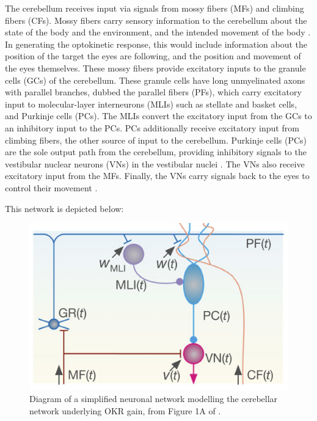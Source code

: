 \documentclass[10pt]{article}
\begin{document}
The cerebellum receives input via signals from mossy fibers (MFs) and climbing fibers (CFs). Mossy fibers carry sensory information to the cerebellum about the state of the body and the environment, and the intended movement of the body \cite{knierim2014information}. In generating the optokinetic response, this would include information about the position of the target the eyes are following, and the position and movement of the eyes themselves. These mossy fibers provide excitatory inputs to the granule cells (GCs) of the cerebellum. These granule cells have long unmyelinated axons with parallel branches, dubbed the parallel fibers (PFs), which carry excitatory input to molecular-layer interneurons (MLIs) such as stellate and basket cells, and Purkinje cells (PCs). The MLIs convert the excitatory input from the GCs to an inhibitory input to the PCs. PCs additionally receive excitatory input from climbing fibers, the other source of input to the cerebellum. Purkinje cells (PCs) are the sole output path from the cerebellum, providing inhibitory signals to the vestibular nuclear neurons (VNs) in the vestibular nuclei \cite{sillitoe2012cerebellum}. The VNs also receive excitatory input from the MFs. Finally, the VNs carry signals back to the eyes to control their movement \cite{yamazaki2015modeling}.

\newpage

This network is depicted below:

\begin{figure}[h]
    \centering
    \includegraphics[scale=0.7]{images/cerebellar_network.png}
    \caption{Diagram of a simplified neuronal network modelling the cerebellar network underlying OKR gain, from Figure 1A of \cite{yamazaki2015modeling}.}
    \label{fig:CerebellarNet}
\end{figure}
\end{document}
